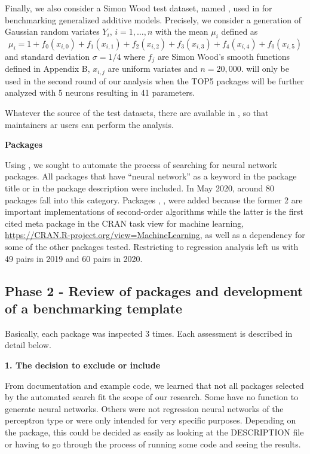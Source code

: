 Finally, we also consider a Simon Wood test dataset, named
, used in \citep{wood2011fast} for benchmarking
generalized additive models. Precisely, we consider a generation of
Gaussian random variates \(Y_i\), \(i=1,\dots,n\) with the mean
\(\mu_i\) defined as \[
\mu_i = 1+ f_0(x_{i,0})+f_1(x_{i,1})+f_2(x_{i,2})+f_3(x_{i,3})
+f_4(x_{i,4})+f_0(x_{i,5})
\] and standard deviation \(\sigma=1/4\) where \(f_j\) are Simon Wood's
smooth functions defined in Appendix B, \(x_{i,j}\) are uniform variates
and \(n=20,000\).  will only be used in the second round
of our analysis when the TOP5 packages will be further analyzed with 5
neurons resulting in 41 parameters.

Whatever the source of the test datasets, there are available in
, so that maintainers ar users can perform the
analysis.

\textbf{Packages}

Using  \citep{R-RWsearch}, we sought to automate the
process of searching for neural network packages. All packages that have
``neural network'' as a keyword in the package title or in the package
description were included. In May 2020, around 80 packages fall into
this category. Packages , ,  were
added because the former 2 are important implementations of second-order
algorithms while the latter is the first cited meta package in the CRAN
task view for machine learning,
\url{https://CRAN.R-project.org/view=MachineLearning}, as well as a
dependency for some of the other packages tested. Restricting to
regression analysis left us with 49  pairs in
2019 and 60  pairs in 2020.

\hypertarget{phase-2---review-of-packages-and-development-of-a-benchmarking-template}{%
\subsection{Phase 2 - Review of packages and development of a
benchmarking
template}\label{phase-2---review-of-packages-and-development-of-a-benchmarking-template}}

Basically, each package was inspected 3 times. Each assessment is
described in detail below.

\textbf{1. The decision to exclude or include}

From documentation and example code, we learned that not all packages
selected by the automated search fit the scope of our research. Some
have no function to generate neural networks. Others were not regression
neural networks of the perceptron type or were only intended for very
specific purposes. Depending on the package, this could be decided as
easily as looking at the DESCRIPTION file or having to go through the
process of running some code and seeing the results.

